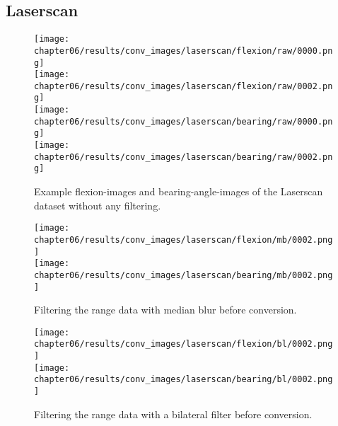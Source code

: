 \subsection{Laserscan}\label{sec:laserscan_conversions}
\begin{figure}[H]
    \texttt{[image: chapter06/results/conv\_images/laserscan/flexion/raw/0000.png]}\\
    \texttt{[image: chapter06/results/conv\_images/laserscan/flexion/raw/0002.png]}\\
    \texttt{[image: chapter06/results/conv\_images/laserscan/bearing/raw/0000.png]}\\
    \texttt{[image: chapter06/results/conv\_images/laserscan/bearing/raw/0002.png]}
    \caption{Example \glspl{flexion-image} and \glspl{bearing-angle-image} of the Laserscan dataset without any filtering.}
\end{figure}
\begin{figure}[H]
    \texttt{[image: chapter06/results/conv\_images/laserscan/flexion/mb/0002.png]}\\
    \texttt{[image: chapter06/results/conv\_images/laserscan/bearing/mb/0002.png]}%
    \caption{Filtering the range data with median blur before conversion.}
\end{figure}
\begin{figure}[H]
    \texttt{[image: chapter06/results/conv\_images/laserscan/flexion/bl/0002.png]}\\
    \texttt{[image: chapter06/results/conv\_images/laserscan/bearing/bl/0002.png]}%
    \caption{Filtering the range data with a bilateral filter before conversion.}
\end{figure}
